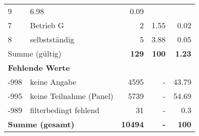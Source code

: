 \begin{longtable}{lXrrr}
       \num{9} &
       \num[round-mode=places,round-precision=2]{6.98} &
         \num[round-mode=places,round-precision=2]{0.09} \\

     7 &
     \multicolumn{1}{X}{ Betrieb G   } &


       \num{2} &
       \num[round-mode=places,round-precision=2]{1.55} &
         \num[round-mode=places,round-precision=2]{0.02} \\

     8 &
     \multicolumn{1}{X}{ selbstständig   } &


       \num{5} &
       \num[round-mode=places,round-precision=2]{3.88} &
         \num[round-mode=places,round-precision=2]{0.05} \\
     \midrule
     \multicolumn{2}{l}{Summe (gültig)} &
       \textbf{\num{129}} &
     \textbf{\num{100}} &
       \textbf{\num[round-mode=places,round-precision=2]{1.23}} \\
     \multicolumn{5}{l}{\textbf{Fehlende Werte}}\\
       -998 &
       keine Angabe &
         \num{4595} &
        - &
         \num[round-mode=places,round-precision=2]{43.79} \\
       -995 &
       keine Teilnahme (Panel) &
         \num{5739} &
        - &
         \num[round-mode=places,round-precision=2]{54.69} \\
       -989 &
       filterbedingt fehlend &
         \num{31} &
        - &
         \num[round-mode=places,round-precision=2]{0.3} \\
     \midrule
     \multicolumn{2}{l}{\textbf{Summe (gesamt)}} &
          \textbf{\num{10494}} &
        \textbf{-} &
        \textbf{\num{100}} \\
     \bottomrule
     \end{longtable}
     
